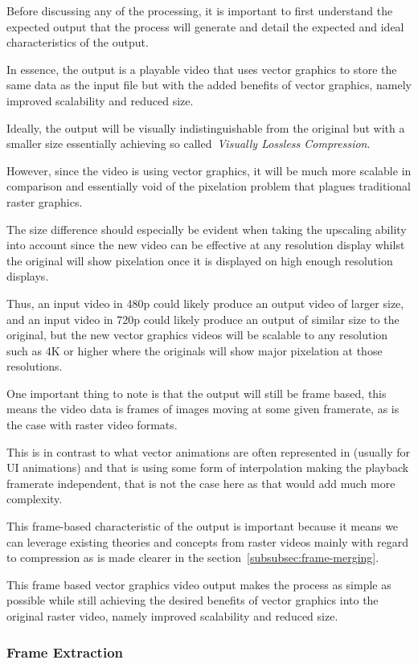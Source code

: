 \documentclass[12pt]{article}
\newcommand{\sentence}{} %
\newcommand{\italic}[1]{\textit{#1}}
\renewcommand{\fullref}[1]{\ref{#1}\nameref{#1}}
\begin{document}
    \tab
    Before discussing any of the processing, it is important to first understand the expected output that the process
    will generate and detail the expected and ideal characteristics of the output.
    \sentence
    In essence, the output is a playable video that uses vector graphics to store the same data as the input file but
    with the added benefits of vector graphics, namely improved scalability and reduced size.
    \sentence
    Ideally, the output will be visually indistinguishable from the original but with a smaller size essentially
    achieving so called~\italic{Visually Lossless Compression}.
    \sentence
    However, since the video is using vector graphics, it will be much more scalable in comparison and essentially
    void of the pixelation problem that plagues traditional raster graphics.
    \sentence
    The size difference should especially be evident when taking the upscaling ability into account since the new
    video can be effective at any resolution display whilst the original will show pixelation once it is displayed on
    high enough resolution displays.
    \sentence
    Thus, an input video in 480p could likely produce an output video of larger size, and an input video in 720p
    could likely produce an output of similar size to the original, but the new vector graphics videos will be
    scalable to any resolution such as 4K or higher where the originals will show major pixelation at those resolutions.
    \sentence
    One important thing to note is that the output will still be frame based, this means the video data is frames of
    images moving at some given framerate, as is the case with raster video formats.
    \sentence
    This is in contrast to what vector animations are often represented in (usually for UI animations) and that is
    using some form of interpolation making the playback framerate independent, that is not the case here as that
    would add much more complexity.
    \sentence
    This frame-based characteristic of the output is important because it means we can leverage existing theories and
    concepts from raster videos mainly with regard to compression as is made clearer in
    the section~\fullref{subsubsec:frame-merging}.
    \sentence
    This frame based vector graphics video output makes the process as simple as possible while still achieving the
    desired benefits of vector graphics into the original raster video, namely improved scalability and reduced size.

    \subsubsection{Frame Extraction}\label{subsubsec:frame-extraction}
\end{document}

